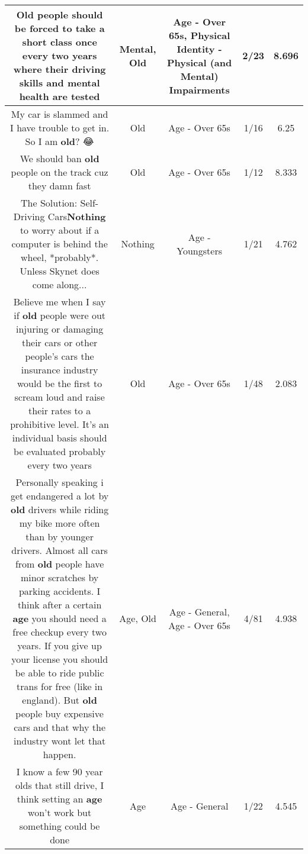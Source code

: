 \documentclass[11pt]{article}
\newlength\mylength
\begin{document}
\begin{center}
\begin{longtable}{|C{.65\mylength}|C{.30\mylength}|C{.12\mylength}|C{.12\mylength}|C{.12\mylength}|}
  \small Old people should be forced to take a short class once every two years where their driving skills and \textbf{mental} health are tested\normalsize   & Mental, Old & Age - Over 65s, Physical Identity - Physical (and Mental) Impairments & 2/23 & 8.696 \\  \hline
  \small My car is slammed and I have trouble to get in. So I am \textbf{old}? 😂\normalsize   & Old & Age - Over 65s & 1/16 & 6.25 \\  \hline
  \small We should ban \textbf{old} people on the track cuz they damn fast\normalsize   & Old & Age - Over 65s & 1/12 & 8.333 \\  \hline
  \small The Solution: Self-Driving Cars\textbf{Nothing} to worry about if a computer is behind the wheel, *probably*. Unless Skynet does come along...\normalsize   & Nothing & Age - Youngsters & 1/21 & 4.762 \\  \hline
  \small Believe me when I say if \textbf{old} people were out injuring or damaging their cars or other people's cars the insurance industry would be the first to scream loud and raise their rates to a prohibitive level. It's an individual basis should be evaluated probably every two years\normalsize   & Old & Age - Over 65s & 1/48 & 2.083 \\  \hline
  \small Personally speaking i get endangered a lot by \textbf{old} drivers while riding my bike more often than by younger drivers. Almost all cars from \textbf{old} people have minor scratches by parking accidents. I think after a certain \textbf{age} you should need a free checkup every two years. If you give up your license you should be able to ride public trans for free (like in england). But \textbf{old} people buy expensive cars and that why the industry wont let that happen.\normalsize   & Age, Old & Age - General, Age - Over 65s & 4/81 & 4.938 \\  \hline
  \small I know a few 90 year olds that still drive, I think setting an \textbf{age} won't work but something could be done\normalsize   & Age & Age - General & 1/22 & 4.545 \\  \hline

\end{longtable}
\end{center}
\end{document}
